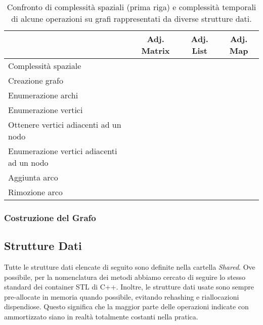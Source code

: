 \begin{table}[ht]
\centering
    \begin{tabular}{|l|ccc|}
    \hline
    &  \multicolumn{1}{c}{Adj. Matrix} & \multicolumn{1}{c}{Adj. List} & \multicolumn{1}{c|}{Adj. Map} \\
    \hline
     Complessità spaziale   & \complexityNSquared{}  & \complexityNPlusM{} & \complexityNPlusM{} \\ \hline

     Creazione grafo & \complexityNSquared{}  & \complexityNPlusM{} & \complexityNPlusM{} \\
     Enumerazione archi & \complexityNSquared{} & \complexityM{} & \complexityM{} \\
     Enumerazione vertici & \complexityN{} & \complexityN{} & \complexityN{} \\
     Ottenere vertici adiacenti ad un nodo & \complexityN{} & \complexityNDegree{} & \complexityConstant{} \\
     Enumerazione vertici adiacenti ad un nodo & \complexityN{} & \complexityNDegree{} &  \complexityNDegree{} \\
     Aggiunta arco & \complexityConstant{} & \complexityConstant{} & \complexityConstant{} \\
     Rimozione arco & \complexityConstant{} & \complexityM{} & \complexityConstant{} \\
    \hline
    \end{tabular}
    \caption{Confronto di complessità spaziali (prima riga) e complessità temporali di alcune operazioni su grafi rappresentati da diverse strutture dati.}
    \label{table:graph-representation-comparison}
\end{table}

\subsubsection {Costruzione del Grafo}


\subsection{Strutture Dati}

Tutte le strutture dati elencate di seguito sono definite nella cartella \textit{Shared}.
Ove possibile, per la nomenclatura dei metodi abbiamo cercato di seguire lo stesso standard dei container STL di C++.
Inoltre, le strutture dati usate sono sempre pre-allocate in memoria quando possibile, evitando rehashing e riallocazioni dispendiose. Questo significa che la maggior parte delle operazioni indicate con \complexityConstant{} ammortizzato siano in realtà totalmente costanti nella pratica.

